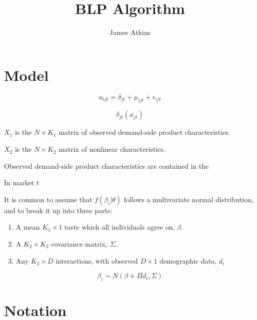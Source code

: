 \documentclass[parskip=half]{scrartcl}
\title{BLP Algorithm}
\author{James Atkins}
\begin{document}
	
\maketitle


\section{Model}


\begin{equation}
u_{ijt} = \delta_{jt} + \mu_{ijt} + \epsilon_{ijt}
\end{equation}

\begin{equation}
\delta_{jt}(x_{jt})
\end{equation}

\(X_1\) is the \(N \times K_1\) matrix of observed demand-side product characteristics.

\(X_2\) is the \(N \times K_2\) matrix of nonlinear characteristics. 

Observed demand-side product characteristics are contained in the 


In market \(t\)



It is common to assume that \(f(\beta_i|\theta)\) follows a multivariate normal distribution, and to break it up into three parts:

\begin{enumerate}
\item A mean \(K_1 \times 1\) taste which all individuals agree on, \(\beta\).
\item A \(K_2 \times K_2\) covariance matrix, \(\Sigma\).
\item Any \(K_2 \times D\) interactions, with observed \(D \times 1\) demographic data, \(d_i\)
\end{enumerate}

\begin{equation}
\beta_i \sim N(\beta + \Pi d_i, \Sigma)
\end{equation}


\section{Notation}
\end{document}
